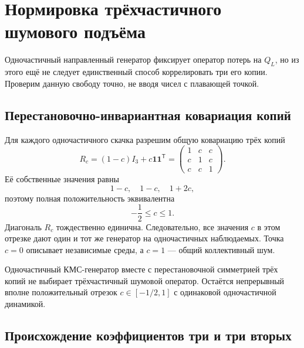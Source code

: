 \chapter{Нормировка трёхчастичного шумового подъёма}
\label{ch:v8-baryon-three-particle-lift-normalization-gate}

Одночастичный направленный генератор фиксирует оператор потерь на $Q_L$,
но из этого ещё не следует единственный способ коррелировать три его копии.
Проверим данную свободу точно, не вводя чисел с плавающей точкой.

\section{Перестановочно-инвариантная ковариация копий}

Для каждого одночастичного скачка разрешим общую ковариацию трёх копий
\begin{equation}
 R_c=(1-c)I_3+c\mathbf1\mathbf1^{\mathsf T}
 =\begin{pmatrix}1&c&c\\c&1&c\\c&c&1\end{pmatrix}.
 \label{eq:v8-baryon-copy-covariance}
\end{equation}
Её собственные значения равны
\begin{equation}
 1-c,\quad1-c,\quad1+2c,
 \label{eq:v8-baryon-copy-covariance-spectrum}
\end{equation}
поэтому полная положительность эквивалентна
\begin{equation}
 -\frac12\leq c\leq1.
 \label{eq:v8-baryon-copy-correlation-cone}
\end{equation}
Диагональ $R_c$ тождественно единична. Следовательно, все значения $c$ в
этом отрезке дают один и тот же генератор на одночастичных наблюдаемых.
Точка $c=0$ описывает независимые среды, а $c=1$ --- общий коллективный шум.

\begin{theorem}
Одночастичный КМС-генератор вместе с перестановочной симметрией трёх копий
не выбирает трёхчастичный шумовой оператор. Остаётся непрерывный вполне
положительный отрезок $c\in[-1/2,1]$ с одинаковой одночастичной динамикой.
\end{theorem}

\section{Происхождение коэффициентов три и три вторых}

